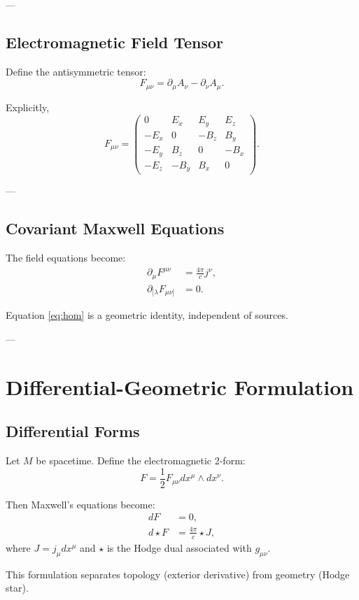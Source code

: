 \documentclass[12pt]{article}
\begin{document}
---

\subsection{Electromagnetic Field Tensor}

Define the antisymmetric tensor:
\[
F_{\mu\nu} = \partial_\mu A_\nu - \partial_\nu A_\mu.
\]

Explicitly,
\[
F_{\mu\nu} =
\begin{pmatrix}
0 & E_x & E_y & E_z \\
-E_x & 0 & -B_z & B_y \\
-E_y & B_z & 0 & -B_x \\
-E_z & -B_y & B_x & 0
\end{pmatrix}.
\]

---

\subsection{Covariant Maxwell Equations}

The field equations become:
\begin{align}
\partial_\mu F^{\mu\nu} &= \frac{4\pi}{c} j^\nu, \label{eq:inhom}\\
\partial_{[\lambda} F_{\mu\nu]} &= 0. \label{eq:hom}
\end{align}

Equation \eqref{eq:hom} is a geometric identity, independent of sources.

---

\section{Differential-Geometric Formulation}

\subsection{Differential Forms}

Let $M$ be spacetime. Define the electromagnetic 2-form:
\[
F = \frac{1}{2}F_{\mu\nu} dx^\mu \wedge dx^\nu.
\]

Then Maxwell’s equations become:
\begin{align}
dF &= 0, \\
d \star F &= \frac{4\pi}{c} \star J,
\end{align}
where $J = j_\mu dx^\mu$ and $\star$ is the Hodge dual associated with $g_{\mu\nu}$.

This formulation separates topology (exterior derivative) from geometry (Hodge star).
\end{document}
